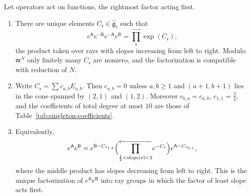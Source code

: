 \begin{proposition}
\label{prop:singleton-completion}
Let operators act on functions, the rightmost factor acting first.
\begin{enumerate}
\item There are unique elements
$C_{\mathfrak r}\in\widehat{\mathfrak g}_{\mathfrak r}$ such that
\begin{equation}\label{eq:singleton-commutator}
 e^{\mathsf A}e^{-\mathsf B}e^{-\mathsf A}e^{\mathsf B}
 =\overrightarrow{\prod_{\mathfrak r}}\exp(C_{\mathfrak r}),
\end{equation}
the product taken over rays with slopes increasing from left to right.
Modulo $\mathfrak m^N$ only finitely many $C_{\mathfrak r}$ are nonzero, and the
factorization is compatible with reduction of $N$.
\item Write $C_{\mathfrak r}=\sum c_{a,b}E_{a,b}$.  Then $c_{a,b}=0$ unless
$a,b\geq1$ and $(a+1,b+1)$ lies in the cone spanned by $(2,1)$ and $(1,2)$.
Moreover $c_{b,a}=c_{a,b}$, $c_{1,1}=\frac34$, and the coefficients of total
degree at most $10$ are those of Table~\ref{tab:singleton-coefficients}.
\item Equivalently,
\begin{equation}\label{eq:singleton-increasing-slope}
 e^{\mathsf A}e^{\mathsf B}
 =e^{\mathsf B-C_{\mathfrak r_{1,2}}}
  \Bigl(\overleftarrow{\prod_{\frac12<\mathrm{slope}(\mathfrak r)<2}}
  e^{-C_{\mathfrak r}}\Bigr)
  e^{\mathsf A-C_{\mathfrak r_{2,1}}},
\end{equation}
where the middle product has slopes decreasing from left to right.  This is
the unique factorization of $e^{\mathsf A}e^{\mathsf B}$ into ray groups in
which the factor of least slope acts first.
\end{enumerate}
\end{proposition}

